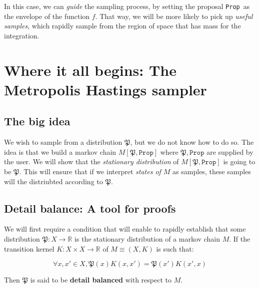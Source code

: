 \documentclass[titlepage]{article}
\newcommand{\R}{\mathbb{R}}
\renewcommand{\P}{\mathfrak{P}}
\newcommand{\Prop}{\texttt{Prop}}
\begin{document}
In this case, we can \emph{guide} the sampling process, by setting the proposal
\Prop~as the envelope of the function $f$. That way, we will be more likely
to pick up \emph{useful samples}, which rapidly sample from the region of
space that has mass for the integration.



\section{Where it all begins: The Metropolis Hastings sampler}
\subsection{The big idea}
We wish to sample from a distribution $\P$, but we do not know how to do so.
The idea is that we build a markov chain $M[\P, \Prop]$ where $\P, \Prop$ are
supplied by the user. We will show that the \emph{stationary distribution} of $M[\P, \Prop]$
is going to be $\P$. This will ensure that if we interpret \emph{states of $M$} as samples,
these samples will the distriubted according to $\P$.

\subsection{Detail balance: A tool for proofs}
We will first require a condition that will enable to rapidly establish that some
distribution $\P: X \rightarrow \R$ is the stationary distribution of a markov chain $M$. If
the transition kernel $K: X \times X \rightarrow \R$ of $M \equiv (X, K)$ is such that:

$$
\forall x, x' \in X, \P(x) K(x, x') = \P(x') K(x', x)
$$

Then $\P$ is said to be \textbf{detail balanced} with respect to $M$.
\end{document}
